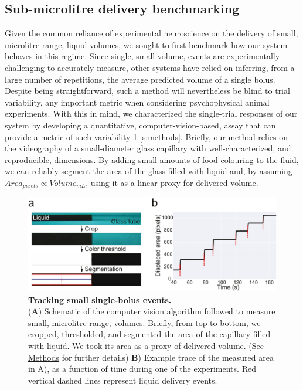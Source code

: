 \subsection*{Sub-microlitre delivery benchmarking}

Given the common reliance of experimental neuroscience on the delivery of small, microlitre range, liquid volumes, we sought to first benchmark how our system behaves in this regime. Since single, small volume, events are experimentally challenging to accurately measure, other systems have relied on inferring, from a large number of repetitions, the average predicted volume of a single bolus. Despite being straightforward, such a method will nevertheless be blind to trial variability, any important metric when considering psychophysical animal experiments. With this in mind, we characterized the single-trial responses of our system by developing a quantitative, computer-vision-based, assay that can provide a metric of such variability \ref{fig:PumpProtocol} \ref{s:methods}. Briefly, our method relies on the videography of a small-diameter glass capillary with well-characterized, and reproducible, dimensions. By adding small amounts of food colouring to the fluid, we can reliably segment the area of the glass filled with liquid and, by assuming $Area_{pixels} \propto Volume_{mL}$, using it as a linear proxy for delivered volume. 

\begin{figure} 
	\centering
	\includegraphics[width=1.0\linewidth]{Figures/Artboard 1_1.pdf}
	\caption{\textbf{Tracking small single-bolus events.}\\
		(\textbf{A}) Schematic of the computer vision algorithm followed to measure small, microlitre range, volumes. Briefly, from top to bottom, we cropped, thresholded, and segmented the area of the capillary filled with liquid. We took its area as a proxy of delivered volume. (See \hyperref[s:methods]{Methods} for further details)  \textbf{B}) Example trace of the measured area in A), as a function of time during one of the experiments. Red vertical dashed lines represent liquid delivery events.}
	\label{fig:PumpProtocol} 
\end{figure}

